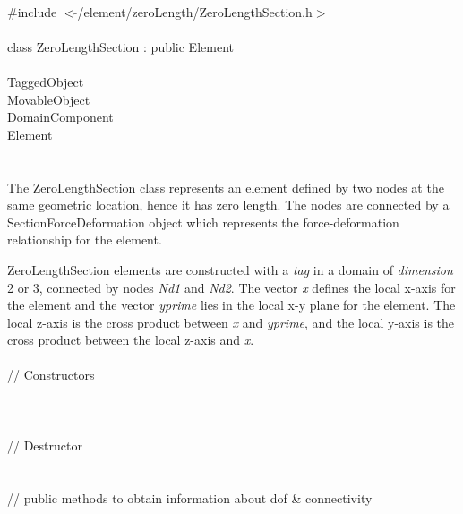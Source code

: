 
   \\
\indent \#include $<\tilde{ }$/element/zeroLength/ZeroLengthSection.h$>$  \\

  \\
\indent class ZeroLengthSection : public Element \\

 \\
\indent TaggedObject \\
\indent MovableObject \\
\indent\indent DomainComponent \\
\indent\indent\indent Element \\
\indent\indent\indent{} \\

  \\
\indent 
The ZeroLengthSection class represents an element defined by two nodes at the same geometric
location, hence it has zero length.
The nodes are connected by a SectionForceDeformation object which
represents the force-deformation relationship for the element. 

ZeroLengthSection elements are constructed with a {\em tag} in a domain of {\em dimension} 2 or 3,
connected by nodes {\em Nd1} and {\em Nd2}. 
The vector {\em x} defines the local x-axis for the element and the vector {\em yprime}
lies in the local x-y plane for the element.  The local z-axis is the cross product between 
{\em x} and {\em yprime}, and the local y-axis is the cross product between the local z-axis
and {\em x}.
\\

 \\
\indent // Constructors \\
 \\
 \\ \\
\indent // Destructor \\
 \\ \\
\indent    // public methods to obtain information about dof \& connectivity \\
 \\
 \\
 \\	
 \\

